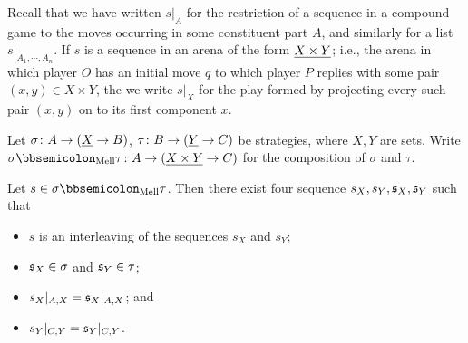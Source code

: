 \documentclass{report}[11pt]
\begin{document}
\begin{definition}
  Recall that we have written $s\vert_A$ for the restriction of a sequence in a compound game to the moves occurring in some constituent part $A$, and similarly for a list $s\vert_{A_1,\cdots,A_n}$.
  If $s$ is a sequence in an arena of the form ${\underline{X\times Y}}$; i.e., the arena in which player $O$ has an initial move $q$ to which player $P$ replies with some pair $(x,y)\in X\times Y$, the we write $s\vert_X$ for the play formed by projecting every such pair $(x,y)$ on to its first component $x$.
\end{definition}

\begin{lemma}
  Let $\sigma\colon A \to ({\underline{X}} \to B)$, $\tau \colon B \to ({\underline{Y}} \to C)$ be strategies, where $X,Y$ are sets.
  Write $\sigma\semicom_{\text{Mell}}\tau \from A \to (\ul{X\times Y} \to C)$ for the \Mellies composition of $\sigma$ and $\tau$.

  Let $s\in\sigma\semicom_{\text{Mell}}\tau$.  
  Then there exist four sequence $s_X,s_Y,\mathfrak s_X,\mathfrak s_Y$ such that
  \begin{itemize}
    \item $s$ is an interleaving of the sequences $s_X$ and $s_Y$;
    \item $\mathfrak s_X\in\sigma$ and $\mathfrak s_Y\in\tau$;
    \item $s_X\vert_{A,X} = \mathfrak s_X\vert_{A,X}$; and
    \item $s_Y\vert_{C,Y} = \mathfrak s_Y\vert_{C,Y}$.
  \end{itemize}
  \label{LemMelliesDecomposition}
\end{lemma}
\end{document}
